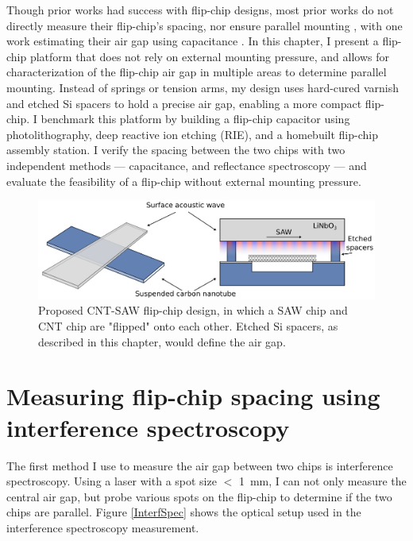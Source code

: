 \documentclass[double,12pt,1in,seploa]{beavtex}
\let\Oldsection\section
\renewcommand{\section}{\FloatBarrier\Oldsection}
\begin{document}
Though prior works had success with flip-chip designs, most prior works do not directly measure their flip-chip’s spacing, nor ensure parallel mounting \cite{chu_creation_2018,satzinger_quantum_2018, bennaceur_mechanical_2015}, with one work estimating their air gap using capacitance \cite{beukman_noninvasive_2015}. In this chapter, I present a flip-chip platform that does not rely on external mounting pressure, and allows for characterization of the flip-chip air gap in multiple areas to determine parallel mounting. Instead of springs or tension arms, my design uses hard-cured varnish and etched Si spacers to hold a precise air gap, enabling a more compact flip-chip. I benchmark this platform by building a flip-chip capacitor using photolithography, deep reactive ion etching (RIE), and a homebuilt flip-chip assembly station. I verify the spacing between the two chips with two independent methods — capacitance, and reflectance spectroscopy — and evaluate the feasibility of a flip-chip without external mounting pressure.

\begin{figure}
    \includegraphics[width=1\textwidth]{Flip-chip intro figure.png}
    \caption{Proposed CNT-SAW flip-chip design, in which a SAW chip and CNT chip are "flipped" onto each other. Etched Si spacers, as described in this chapter, would define the air gap.}
    \label{flip-chip intro figure}
\end{figure}

\section{Measuring flip-chip spacing using interference spectroscopy}

The first method I use to measure the air gap between two chips is interference spectroscopy. Using a laser with a spot size $<$ \SI{1}{\milli\meter}, I can not only measure the central air gap, but probe various spots on the flip-chip to determine if the two chips are parallel. Figure \ref{InterfSpec} shows the optical setup used in the interference spectroscopy measurement.
\end{document}
